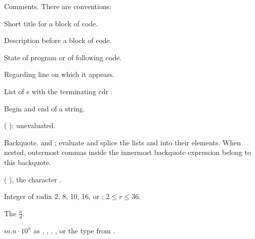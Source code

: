 \begin{LIST}{1cm}

  {
  Comments. There are conventions:
  }
  \begin{LIST}{.5cm}
    {Short title for a block of code.}

    {Description before a block of code.}

    {State of program or of following code.}

    {Regarding line on which it appears.}

  \end{LIST}

  {
    List of s with the terminating cdr .
  }

  {
    Begin and end of a string.
  }

  {
    ( );  unevaluated.
  }

  {
    Backquote.   and ; evaluate 
    and splice the lists  and  into their
    elements. When nested, outermost commas inside the innermost
    backquote expression belong to this backquote.
  }

  {
  ( ), the character .
  }

  {%
    Integer of radix 2, 8, 10, 16, or ; $2\le r \le 36$.
  }

  {
    The  $\frac{n}{d}$.
  }

  {
    $m.n\cdot10^x$ as , ,
    , , or the type from .
  }


\end{LIST}
